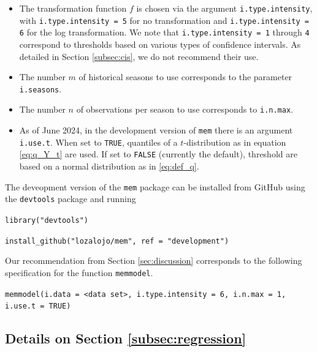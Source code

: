 \documentclass[12pt]{article}
\begin{document}
\begin{itemize}
\item The transformation function $f$ is chosen via the argument \texttt{i.type.intensity}, with \texttt{i.type.intensity = 5} for no transformation and \texttt{i.type.intensity = 6} for the log transformation. We note that \texttt{i.type.intensity = 1} through \texttt{4} correspond to thresholds based on various types of confidence intervals. As detailed in Section \ref{subsec:cis}, we do not recommend their use.
\item The number $m$ of historical seasons to use corresponds to the parameter \texttt{i.seasons}.
\item The number $n$ of observations per season to use corresponds to \texttt{i.n.max}.
\item As of June 2024, in the development version of \texttt{mem} there is an argument \texttt{i.use.t}. When set to \texttt{TRUE}, quantiles of a $t$-distribution as in equation \eqref{eq:q_Y_t} are used. If set to \texttt{FALSE} (currently the default), threshold are based on a normal distribution as in \eqref{eq:def_q}.
\end{itemize}
The deveopment version of the \texttt{mem} package can be installed from GitHub using the \texttt{devtools} package and running
\medskip

\texttt{library("devtools")}

\texttt{install\_github("lozalojo/mem", ref = "development")}

\medskip

\noindent Our recommendation from Section \ref{sec:discussion} corresponds to the following specification for the function \texttt{memmodel}.
\medskip

\texttt{memmodel(i.data = <data set>, i.type.intensity = 6, i.n.max = 1, i.use.t = TRUE)}

\medskip

\subsection{Details on Section \ref{subsec:regression}}
\label{suppl:regression}
\end{document}

